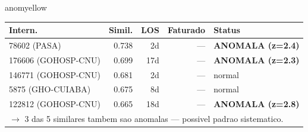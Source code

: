 \documentclass[a4paper,10pt]{article}
\begin{document}
\begin{anomalycard}[Internacao 28 | GHO-POSTAL | MODERADO (z=2.19)]{anomyellow}
\begin{tabular}{l r r r l}\toprule\textbf{Intern.} & \textbf{Simil.} & \textbf{LOS} & \textbf{Faturado} & \textbf{Status} \\\midrule
78602 (PASA) & 0.738 & 2d & --- & \textcolor{anomred}{\textbf{ANOMALA (z=2.4)}} \\
176606 (GOHOSP-CNU) & 0.699 & 17d & --- & \textcolor{anomred}{\textbf{ANOMALA (z=2.3)}} \\
146771 (GOHOSP-CNU) & 0.681 & 2d & --- & \textcolor{jcubeblue}{normal} \\
5875 (GHO-CUIABA) & 0.675 & 8d & --- & \textcolor{jcubeblue}{normal} \\
122812 (GOHOSP-CNU) & 0.665 & 18d & --- & \textcolor{anomred}{\textbf{ANOMALA (z=2.8)}} \\
\multicolumn{5}{l}{\textcolor{anomred}{\small $\rightarrow$ 3 das 5 similares tambem sao anomalas --- possivel padrao sistematico.}} \\
\bottomrule\end{tabular}


\end{anomalycard}

\newpage
\end{document}
